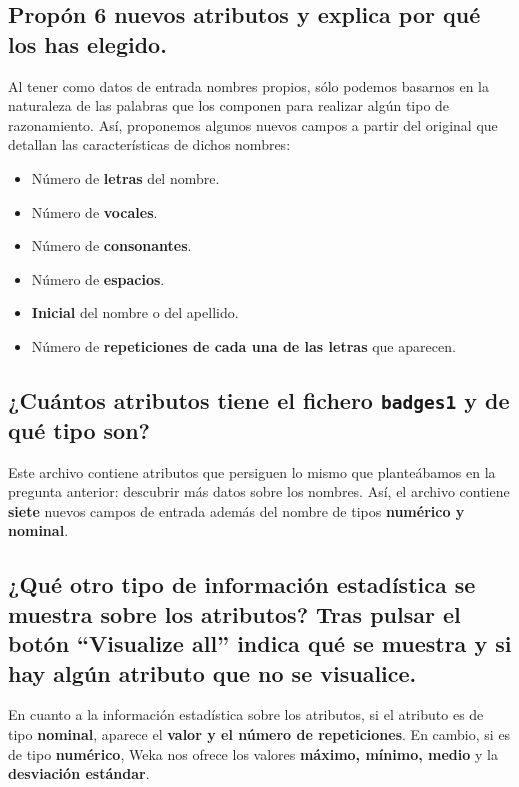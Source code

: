 \documentclass[12pt]{article}
\begin{document}
\subsection*{\small Propón 6 nuevos atributos y explica por qué los has elegido.}

Al tener como datos de entrada nombres propios, sólo podemos basarnos en la naturaleza de las palabras que los componen para realizar algún tipo de razonamiento. Así, proponemos algunos nuevos campos a partir del original que detallan las características de dichos nombres:

\begin{itemize}
    \item Número de \textbf{letras} del nombre.
    \item Número de \textbf{vocales}.
    \item Número de \textbf{consonantes}.
    \item Número de \textbf{espacios}.
    \item \textbf{Inicial} del nombre o del apellido.
    \item Número de \textbf{repeticiones de cada una de las letras} que aparecen.
\end{itemize}

\subsection*{\small ¿Cuántos atributos tiene el fichero \texttt{badges1} y de qué tipo son?}

Este archivo contiene atributos que persiguen lo mismo que planteábamos en la pregunta anterior: descubrir más datos sobre los nombres. Así, el archivo contiene \textbf{siete} nuevos campos de entrada además del nombre de tipos \textbf{numérico y nominal}.

\subsection*{\small ¿Qué otro tipo de información estadística se muestra sobre los atributos? Tras pulsar el botón ``Visualize all'' indica qué se muestra y si hay algún atributo que no se visualice.}

En cuanto a la información estadística sobre los atributos, si el atributo es de tipo \textbf{nominal}, aparece el \textbf{valor y el número de repeticiones}. En cambio, si es de tipo \textbf{numérico}, Weka nos ofrece los valores \textbf{máximo, mínimo, medio} y la \textbf{desviación estándar}.
\end{document}
